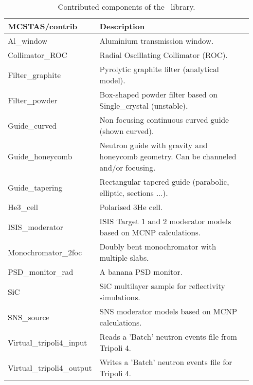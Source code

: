 \begin{table}
  \begin{center}
    {\let\my=\\
    \begin{tabular}{|p{}|p{}|}
      \hline
       {\bf MCSTAS/contrib} & Description \\
       \hline
 Al\_window     &         Aluminium transmission window. \\
 Collimator\_ROC   &      Radial Oscillating Collimator (ROC). \\
 Filter\_graphite  &      Pyrolytic graphite filter (analytical model). \\
 Filter\_powder   &       Box-shaped powder
                        filter based on Single\_crystal (unstable). \\
 Guide\_curved     &     Non focusing continuous curved guide (shown curved). \\
 Guide\_honeycomb & Neutron guide with gravity and honeycomb geometry. Can be
                        channeled and/or focusing. \\
 Guide\_tapering  &     Rectangular tapered guide (parabolic, elliptic, sections ...). \\
 He3\_cell    &           Polarised 3He cell. \\
 ISIS\_moderator    &     ISIS Target 1 and 2 moderator models based on MCNP calculations. \\
 Monochromator\_2foc   &  Doubly bent monochromator with multiple slabs. \\
 PSD\_monitor\_rad & A banana PSD monitor. \\
 SiC           &         SiC multilayer sample for reflectivity simulations. \\
 SNS\_source    & SNS moderator models based on MCNP calculations. \\
 Virtual\_tripoli4\_input & Reads a 'Batch' neutron events file from Tripoli 4. \\
 Virtual\_tripoli4\_output& Writes a 'Batch' neutron events file for Tripoli 4. \\
      \hline
    \end{tabular}
    \caption{Contributed components of the \MCS\ library.}
    \label{t:comp-contrib}
    }
  \end{center}
\end{table}

